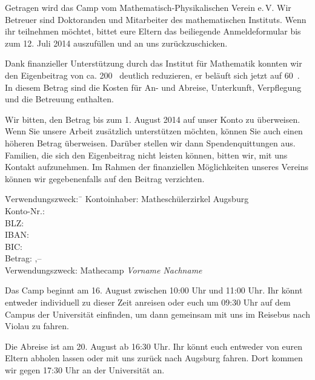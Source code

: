 \documentclass{zettel}
\begin{document}
Getragen wird das Camp vom Mathematisch-Physikalischen Verein e.\,V. Wir
Betreuer sind Doktoranden und Mitarbeiter des mathematischen Instituts.
Wenn ihr teilnehmen möchtet, bittet eure Eltern das beiliegende Anmeldeformular
bis zum 12. Juli 2014 auszufüllen und an uns zurückzuschicken.
\vspace{\medskipamount}

\begin{minipage}{0.54\textwidth}
Dank finanzieller Unterstützung durch das Institut für Mathematik konnten wir
den Eigenbeitrag von ca. 200~\texteuro{} deutlich reduzieren, er beläuft sich
jetzt auf 60~\texteuro. In diesem Betrag sind die Kosten für An- und Abreise,
Unterkunft, Verpflegung und die Betreuung enthalten.
\end{minipage}

\newpage

Wir bitten, den Betrag bis zum 1. August 2014 auf
unser Konto zu überweisen. Wenn Sie unsere Arbeit zusätzlich unterstützen
möchten, können Sie auch einen höheren Betrag überweisen. Darüber stellen wir
dann Spendenquittungen aus. Familien, die sich den
Eigenbeitrag nicht leisten können, bitten wir, mit uns Kontakt aufzunehmen. Im
Rahmen der finanziellen Möglichkeiten unseres Vereins können wir gegebenenfalls
auf den Beitrag verzichten.

\vspace{-0.7em}
\begin{tabbing}
  \qquad\qquad \= Verwendungszweck:\, \= \kill
  \> Kontoinhaber: \> Matheschülerzirkel Augsburg \\
  \> Konto-Nr.:  \\
  \> BLZ:  \\
  \> IBAN:  \\
  \> BIC:  \\
  \> Betrag: ,-- \texteuro \\
  \> Verwendungszweck: \> Mathecamp \emph{Vorname Nachname}
\end{tabbing}
\vspace{-0.7em}

Das Camp beginnt am 16. August zwischen 10:00 Uhr und 11:00 Uhr. Ihr könnt
entweder individuell zu dieser Zeit anreisen oder euch um 09:30 Uhr auf dem Campus der
Universität einfinden, um dann gemeinsam mit uns im Reisebus nach Violau zu fahren.

Die Abreise ist am 20. August ab 16:30 Uhr. Ihr könnt euch entweder von euren
Eltern abholen lassen oder mit uns zurück nach Augsburg fahren. Dort kommen wir
gegen 17:30 Uhr an der Universität an.
\end{document}

